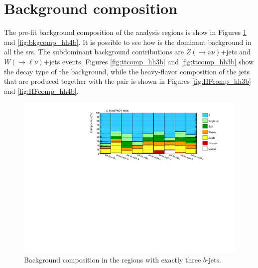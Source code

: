 \section{Background composition}
\label{sec:ewk:bkgcomp}

The pre-fit background composition of the analysis regions is show in Figures \ref{fig:bkgcomp_hh3b} and \ref{fig:bkgcomp_hh4b}.
It is possible to see how \ttbar is the dominant background in all the \glspl{sr}.
The subdominant background contributions are $Z(\to \nu\nu)$+jets and $W(\to \ell\nu)$+jets events.
Figures \ref{fig:ttcomp_hh3b} and \ref{fig:ttcomp_hh3b} show the decay type of the \ttbar background,
while the heavy-flavor composition of the jets that are produced together with the \ttbar pair is shown 
in Figures \ref{fig:HFcomp_hh3b} and \ref{fig:HFcomp_hh4b}.

\begin{figure}[htbp]
\includegraphics[width=\textwidth]{figures/ewk_prod/comp_plots/hh_3b_bkg.pdf}
\caption{Background composition in the regions with exactly three $b$-jets.}
	\label{fig:bkgcomp_hh3b}
\end{figure}

